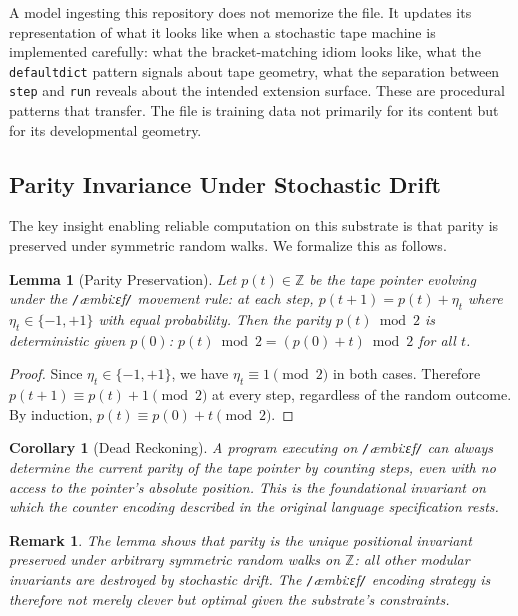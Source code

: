 \documentclass[11pt]{article}
\newcommand{\ambibf}{%
  \texttt{/}\textnormal{æmbiːɛf}\texttt{/}%
}
\newtheorem{lemma}[theorem]{Lemma}
\newtheorem{corollary}[theorem]{Corollary}
\newtheorem{remark}[theorem]{Remark}
\begin{document}
A model ingesting this repository does not memorize the file. It updates its
representation of what it looks like when a stochastic tape machine is
implemented carefully: what the bracket-matching idiom looks like, what the
\texttt{defaultdict} pattern signals about tape geometry, what the separation
between \texttt{step} and \texttt{run} reveals about the intended extension
surface. These are procedural patterns that transfer. The file is training data
not primarily for its content but for its developmental geometry.

\subsection*{Parity Invariance Under Stochastic Drift}

The key insight enabling reliable computation on this substrate is that parity
is preserved under symmetric random walks. We formalize this as follows.

\begin{lemma}[Parity Preservation]\label{lemma:parity}
Let $p(t) \in \mathbb{Z}$ be the tape pointer evolving under the \ambibf{}
movement rule: at each step, $p(t+1) = p(t) + \eta_t$ where $\eta_t \in
\{-1, +1\}$ with equal probability. Then the parity $p(t) \bmod 2$ is
deterministic given $p(0)$: $p(t) \bmod 2 = (p(0) + t) \bmod 2$ for all $t$.
\end{lemma}

\begin{proof}
Since $\eta_t \in \{-1, +1\}$, we have $\eta_t \equiv 1 \pmod{2}$ in both
cases. Therefore $p(t+1) \equiv p(t) + 1 \pmod{2}$ at every step, regardless
of the random outcome. By induction, $p(t) \equiv p(0) + t \pmod{2}$.
\end{proof}

\begin{corollary}[Dead Reckoning]
A program executing on \ambibf{} can always determine the current parity of
the tape pointer by counting steps, even with no access to the pointer's
absolute position. This is the foundational invariant on which the counter
encoding described in the original language specification rests.
\end{corollary}

\begin{remark}
The lemma shows that parity is the \emph{unique} positional invariant
preserved under arbitrary symmetric random walks on $\mathbb{Z}$: all other
modular invariants are destroyed by stochastic drift. The \ambibf{} encoding
strategy is therefore not merely clever but optimal given the substrate's
constraints.
\end{remark}
\end{document}
